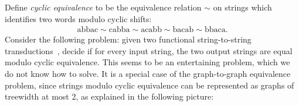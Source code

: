     \begin{example}
        Define \emph{cyclic equivalence} to be the equivalence relation $\sim$ on strings which identifies two words modulo cyclic shifts:
        \begin{align*}
            \text{abbac} \sim
            \text{cabba} \sim
            \text{acabb} \sim
            \text{bacab} \sim
            \text{bbaca}   .
         \end{align*}
         Consider the following  problem: given two functional string-to-string \mso transductions~\cite[Definition 1]{engelfrietMSODefinableString2001},
        decide if for every input string, the two output strings are equal  modulo cyclic equivalence. This seems to be an entertaining problem, which we do not know how to solve. It is a special case of the graph-to-graph equivalence problem, since  strings modulo cyclic equivalence  can be represented as graphs of treewidth at most 2, as explained in the following picture:
        \end{example}